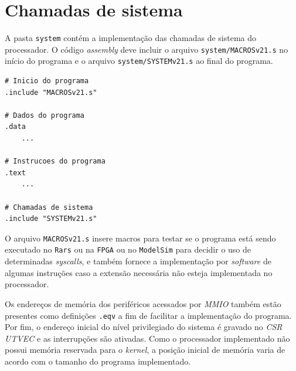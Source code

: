    \section{Chamadas de sistema}
    { A pasta \texttt{system} contém a implementação das chamadas de sistema do
        processador. O código \textit{assembly} deve incluir o arquivo
        \texttt{system/MACROSv21.s} no início do programa e o arquivo
        \texttt{system/SYSTEMv21.s} ao final do programa.
    }
    \begin{lstlisting}
# Inicio do programa
.include "MACROSv21.s"

# Dados do programa
.data
    ...

# Instrucoes do programa
.text
    ...

# Chamadas de sistema
.include "SYSTEMv21.s"
    \end{lstlisting}

    { O arquivo \texttt{MACROSv21.s} insere macros para testar se o programa
        está sendo executado no \texttt{Rars} ou na \texttt{FPGA} ou no
        \texttt{ModelSim} para decidir o uso de determinadas \textit{syscalls},
        e também fornece a implementação por \textit{software} de algumas
        instruções caso a extensão necessária não esteja implementada no processador.
    }

    { Os endereços de memória dos periféricos acessados por \textit{MMIO} também
        estão presentes como definições \texttt{.eqv} a fim de facilitar a
        implementação do programa.
    }
    { Por fim, o endereço inicial do nível privilegiado do sistema é gravado no
        \textit{CSR UTVEC} e as interrupções são ativadas. Como o processador
        implementado não possui memória reservada para o \textit{kernel}, a
        posição inicial de memória varia de acordo com o tamanho do programa
        implementado.
    }

